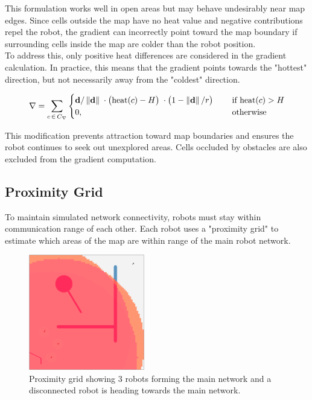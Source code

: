 This formulation works well in open areas but may behave undesirably near map edges. Since cells outside the map have no heat value and negative contributions repel the robot, the gradient can incorrectly point toward the map boundary if surrounding cells inside the map are colder than the robot position.  \\

To address this, only positive heat differences are considered in the gradient calculation. In practice, this means that the gradient points towards the "hottest" direction, but not necessarily away from the "coldest" direction.

\begin{equation}
\label{eq:robot-gradient}
    \nabla = \sum_{c\,\in\,C_\nabla}
    \begin{cases}
        \mathbf{d}/\left\lVert\mathbf{d}\right\rVert      \; \cdot
        \big(\mathrm{heat}(c) - H\big)    \; \cdot
        \big(1 - \left\lVert\mathbf{d}\right\rVert/r\big) \; \quad &\text{if } \mathrm{heat}(c) > H
        \\
        0, \quad &\text{otherwise}
    \end{cases}
\end{equation}

This modification prevents attraction toward map boundaries and ensures the robot continues to seek out unexplored areas. Cells occluded by obstacles are also excluded from the gradient computation.


\subsection{Proximity Grid}
To maintain simulated network connectivity, robots must stay within communication range of each other. Each robot uses a "proximity grid" to estimate which areas of the map are within range of the main robot network.

\begin{figure}[H]
    \begin{center}
        \includegraphics[width=0.45\textwidth]{figures/screenshots/proximity-gradient.png}
    \end{center}
    \caption{Proximity grid showing 3 robots forming the main network and a disconnected robot is heading towards the main network.}
    \label{fig:proximity-grid}
\end{figure}

